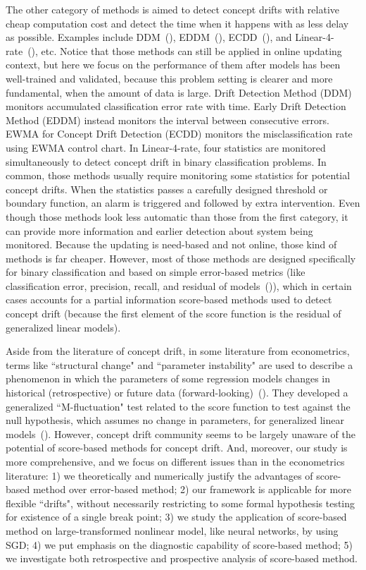 \documentclass[twoside,11pt]{article}
\begin{document}
The other category of methods is aimed to detect concept drifts with relative cheap computation cost and detect the time when it happens with as less delay as possible. Examples include DDM~(\cite{gama2004learning}), EDDM~(\cite{baena2006early}), ECDD~(\cite{ross2012exponentially}), and Linear-4-rate~(\cite{wang2015concept}), etc. Notice that those methods can still be applied in online updating context, but here we focus on the performance of them after models has been well-trained and validated, because this problem setting is clearer and more fundamental, when the amount of data is large. Drift Detection Method (DDM)~\cite{gama2004learning} monitors accumulated classification error rate with time. Early Drift Detection Method (EDDM) instead monitors the interval between consecutive errors. EWMA for Concept Drift Detection (ECDD) monitors the misclassification rate using EWMA control chart. In Linear-4-rate, four statistics are monitored simultaneously to detect concept drift in binary classification problems. In common, those methods usually require monitoring some statistics for potential concept drifts. When the statistics passes a carefully designed threshold or boundary function, an alarm is triggered and followed by extra intervention. Even though those methods look less automatic than those from the first category, it can provide more information and earlier detection about system being monitored. Because the updating is need-based and not online, those kind of methods is far cheaper. However, most of those methods are designed specifically for binary classification and based on simple error-based metrics (like classification error, precision, recall, and residual of models~(\cite{barros2018large,wang2015concept})), which in certain cases accounts for a partial information score-based methods used to detect concept drift (because the first element of the score function is the residual of generalized linear models).

Aside from the literature of concept drift, in some literature from econometrics, terms like ``structural change" and ``parameter instability" are used to describe a phenomenon in which the parameters of some regression models changes in historical (retrospective) or future data (forward-looking)~(\cite{zeileis2005unified}). They developed a generalized ``M-fluctuation" test related to the score function to test against the null hypothesis, which assumes no change in parameters, for generalized linear models~(\cite{zeileis2007generalized}). However, concept drift community seems to be largely unaware of the potential of score-based methods for concept drift. And, moreover, our study is more comprehensive, and we focus on different issues than in the econometrics literature: 1) we theoretically and numerically justify the advantages of score-based method over error-based method; 2) our framework is applicable for more flexible ``drifts", without necessarily restricting to some formal hypothesis testing for existence of a single break point; 3) we study the application of score-based method on large-transformed nonlinear model, like neural networks, by using SGD; 4) we put emphasis on the diagnostic capability of score-based method; 5) we investigate both retrospective and prospective analysis of score-based method.
\end{document}
